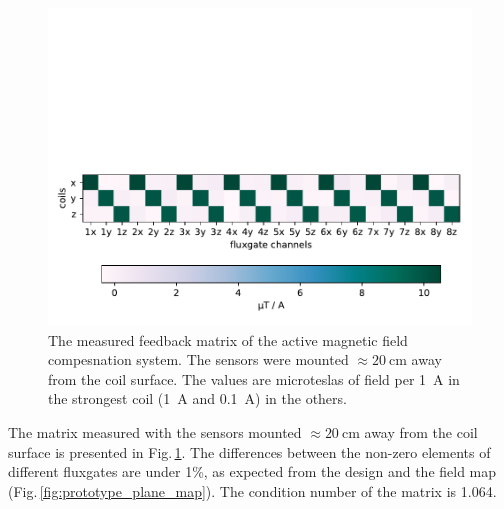 \begin{figure}
  \centering
  \includegraphics[width=.9\linewidth]{gfx/prototype/SFC_matrix_green.pdf}
  \caption{The measured feedback matrix of the active magnetic field compesnation system. The sensors were mounted $\approx\SI{20}{\centi\meter}$ away from the coil surface. The values are microteslas of field per \SI{1}{\ampere} in the strongest coil (\SI{1}{\ampere} and \SI{0.1}{\ampere}) in the others.}\label{fig:prototype_feedback_matrix}
\end{figure}

The matrix measured with the sensors mounted $\approx\SI{20}{\centi\meter}$ away from the coil surface is presented in Fig.\,\ref{fig:prototype_feedback_matrix}. The differences between the non-zero elements of different fluxgates are under 1\%, as expected from the design and the field map (Fig.\,\ref{fig:prototype_plane_map}). The condition number of the matrix is \num{1.064}.




